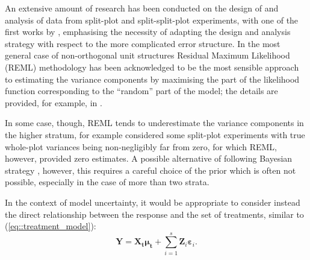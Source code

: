 An extensive amount of research has been conducted on the design of and analysis of data from split-plot and split-split-plot experiments, with one of the first works by \cite{Letsinger1996BiRandomization}, emphasising the necessity of adapting the design and analysis strategy with respect to the more complicated error structure.  In the most general case of non-orthogonal unit structures Residual Maximum Likelihood (REML) methodology has been acknowledged to be the most sensible approach to estimating the variance components by maximising the part of the likelihood function corresponding to the ``random'' part of the model; the details are provided, for example, in \cite{Searle2001generalized}. 


In some case, though,  REML tends to underestimate the variance components in the higher stratum, for example \cite{Goos2006practical} considered some split-plot experiments with true whole-plot variances being non-negligibly far from zero, for which REML, however, provided zero estimates. A possible alternative of following Bayesian strategy \citep{Gilmour2009analysis}, however, this requires a careful choice of the prior which is often not possible, especially in the case of more than two strata.

In the context of model uncertainty, it would be appropriate to consider instead the direct relationship between the response and the set of treatments, similar to (\ref{eq::treatment_model}):
\begin{equation}
\label{eq::treatmentMS}
\bm{Y}=\bm{X_t}\bm{\mu_t}+\sum_{i=1}^{s}\bm{Z}_{i}\bm{\varepsilon}_{i}.
\end{equation}

